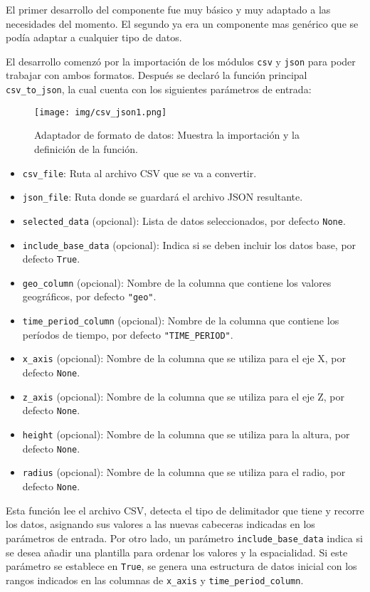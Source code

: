 \documentclass[a4paper, 12pt]{book}
\begin{document}
        El primer desarrollo del componente fue muy básico y muy adaptado a las necesidades del momento. El segundo ya era un componente mas genérico que se podía adaptar a cualquier tipo de datos.

El desarrollo comenzó por la importación de los módulos \texttt{csv} y \texttt{json} para poder trabajar con ambos formatos. Después se declaró la función principal \texttt{csv\_to\_json}, la cual cuenta con los siguientes parámetros de entrada:
\begin{figure}[H]
    \centering
    \texttt{[image: img/csv\_json1.png]}
    \caption{Adaptador de formato de datos: Muestra la importación y la definición de la función.}
    \label{fig:csv_json1}
\end{figure}
\begin{itemize}
    \item \texttt{csv\_file}: Ruta al archivo CSV que se va a convertir.
    \item \texttt{json\_file}: Ruta donde se guardará el archivo JSON resultante.
    \item \texttt{selected\_data} (opcional): Lista de datos seleccionados, por defecto \texttt{None}.
    \item \texttt{include\_base\_data} (opcional): Indica si se deben incluir los datos base, por defecto \texttt{True}.
    \item \texttt{geo\_column} (opcional): Nombre de la columna que contiene los valores geográficos, por defecto \texttt{"geo"}.
    \item \texttt{time\_period\_column} (opcional): Nombre de la columna que contiene los períodos de tiempo, por defecto \texttt{"TIME\_PERIOD"}.
    \item \texttt{x\_axis} (opcional): Nombre de la columna que se utiliza para el eje X, por defecto \texttt{None}.
    \item \texttt{z\_axis} (opcional): Nombre de la columna que se utiliza para el eje Z, por defecto \texttt{None}.
    \item \texttt{height} (opcional): Nombre de la columna que se utiliza para la altura, por defecto \texttt{None}.
    \item \texttt{radius} (opcional): Nombre de la columna que se utiliza para el radio, por defecto \texttt{None}.
\end{itemize}

Esta función lee el archivo CSV, detecta el tipo de delimitador que tiene y recorre los datos, asignando sus valores a las nuevas cabeceras indicadas en los parámetros de entrada. Por otro lado, un parámetro \texttt{include\_base\_data} indica si se desea añadir una plantilla para ordenar los valores y la espacialidad. Si este parámetro se establece en \texttt{True}, se genera una estructura de datos inicial con los rangos indicados en las columnas de \texttt{x\_axis} y \texttt{time\_period\_column}.
\end{document}
